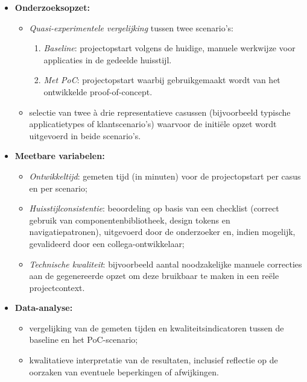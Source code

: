 \begin{itemize}
  \item \textbf{Onderzoeksopzet:}
        \begin{itemize}
          \item \emph{Quasi-experimentele vergelijking} tussen twee scenario's:
                \begin{enumerate}
                  \item \emph{Baseline}: projectopstart volgens de huidige, manuele werkwijze voor applicaties in de gedeelde huisstijl.
                  \item \emph{Met PoC}: projectopstart waarbij gebruikgemaakt wordt van het ontwikkelde proof-of-concept.
                \end{enumerate}
          \item selectie van twee à drie representatieve casussen (bijvoorbeeld typische applicatietypes of klantscenario's) waarvoor de initiële opzet wordt uitgevoerd in beide scenario's.
        \end{itemize}
  \item \textbf{Meetbare variabelen:}
        \begin{itemize}
          \item \emph{Ontwikkeltijd}: gemeten tijd (in minuten) voor de projectopstart per casus en per scenario;
          \item \emph{Huisstijlconsistentie}: beoordeling op basis van een checklist (correct gebruik van componentenbibliotheek, design tokens en navigatiepatronen), uitgevoerd door de onderzoeker en, indien mogelijk, gevalideerd door een collega-ontwikkelaar;
          \item \emph{Technische kwaliteit}: bijvoorbeeld aantal noodzakelijke manuele correcties aan de gegenereerde opzet om deze bruikbaar te maken in een reële projectcontext.
        \end{itemize}
  \item \textbf{Data-analyse:}
        \begin{itemize}
          \item vergelijking van de gemeten tijden en kwaliteitsindicatoren tussen de baseline en het PoC-scenario;
          \item kwalitatieve interpretatie van de resultaten, inclusief reflectie op de oorzaken van eventuele beperkingen of afwijkingen.
        \end{itemize}
\end{itemize}

